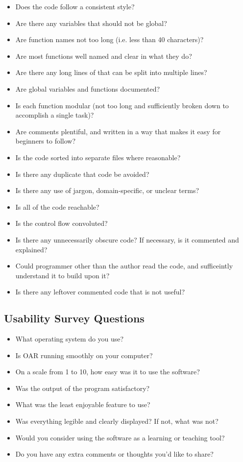 \documentclass[12pt, titlepage]{article}
\begin{document}
\begin{itemize}
  \item{Does the code follow a consistent style?}
  \item{Are there any variables that should not be global?}
  \item{Are function names not too long (i.e. less than 40 characters)?}
  \item{Are most functions well named and clear in what they do?}
  \item{Are there any long lines of that can be split into multiple lines?}
  \item{Are global variables and functions documented?}
  \item{Is each function modular (not too long and sufficiently broken down to accomplish a single task)?}
  \item{Are comments plentiful, and written in a way that makes it easy for beginners to follow?}
  \item{Is the code sorted into separate files where reasonable?}
  \item{Is there any duplicate that code be avoided?}
  \item{Is there any use of jargon, domain-specific, or unclear terms?}
  \item{Is all of the code reachable?}
  \item{Is the control flow convoluted?}
  \item{Is there any unnecessarily obscure code? If necessary, is it commented and explained?}
  \item{Could programmer other than the author read the code, and sufficeintly understand it to build upon it?}
  \item{Is there any leftover commented code that is not useful?}
\end{itemize}

\subsection{Usability Survey Questions} \label{survey_useability}

\begin{itemize}
  \item{What operating system do you use?}
  \item{Is OAR running smoothly on your computer?}
  \item{On a scale from 1 to 10, how easy was it to use the software?}
  \item{Was the output of the program satisfactory?}
  \item{What was the least enjoyable feature to use?}
  \item{Was everything legible and clearly displayed? If not, what was not?}
  \item{Would you consider using the software as a learning or teaching tool?}
  \item{Do you have any extra comments or thoughts you'd like to share?}
\end{itemize}
\end{document}
